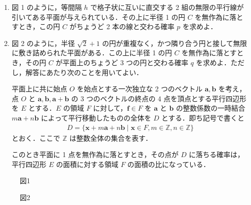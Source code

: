 \documentclass[../../main.tex]{subfiles}
\begin{document}
\begin{enumerate}
  \item 図 1 のように，等間隔 $h$ で格子状に互いに直交する 2 組の無限の平行線が引いてある平面が与えられている．その上に半径 1 の円 $C$ を無作為に落とすとき，この円 $C$ がちょうど 2 本の線と交わる確率 $p$ を求めよ．
  \item 図 2 のように，半径 $\sqrt{2} + 1$ の円が重複なく，かつ隣り合う円と接して無限に敷き詰められた平面がある．この上に半径 1 の円 $C$ を無作為に落とすとき，その円 $C$ が平面上のちょうど 3 つの円と交わる確率 $q$ を求めよ．ただし，解答にあたり次のことを用いてよい．

    平面上に共に始点 $O$ を始点とする一次独立な 2 つのベクトル $\mathbf{a}, \mathbf{b}$ を考え，点 $O$ と $\mathbf{a}, \mathbf{b}, \mathbf{a} + \mathbf{b}$ の 3 つのベクトルの終点の 4 点を頂点とする平行四辺形を $E$ とする．$E$ の領域 $F$ に対して，$\mathbf{f} \in F$ を $\mathbf{a}$ と $\mathbf{b}$ の整数係数の一時結合 $m\mathbf{a} + n\mathbf{b}$ によって平行移動したものの全体を $D$ とする．即ち記号で書くと
    \begin{align}
      D = \{\mathbf{x} + m\mathbf{a} + n\mathbf{b} \mid \mathbf{x} \in F, m \in \mathbb{Z}, n \in \mathbb{Z} \}
    \end{align}
    とおく．ここで $\mathbb{Z}$ は整数全体の集合を表す．

    このとき平面に 1 点を無作為に落とすとき，その点が $D$ に落ちる確率は，平行四辺形 $E$ の面積に対する領域 $F$ の面積の比になっている．
\end{enumerate}

\begin{figure}[H]
  \centering
  \caption{図1}
\end{figure}

\begin{figure}[H]
  \centering
  \caption{図2}

\end{figure}
\end{document}
